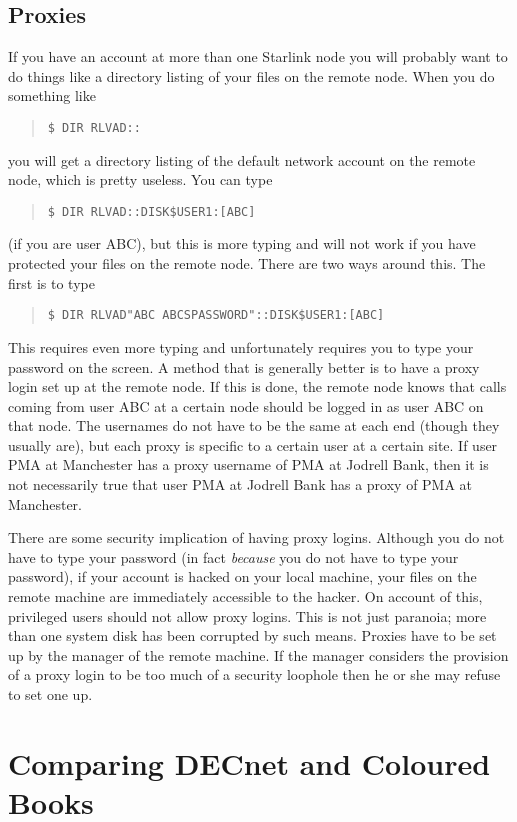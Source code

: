 \subsection{Proxies}
If you have an account at more than one Starlink node you will probably
want to do things like a directory listing of your files on the remote
node. When you do something like
\begin{quote}
{\tt \$ DIR RLVAD::}
\end{quote}
you will get a directory listing of the default network account on the
remote node, which is pretty useless. You can type
\begin{quote}
{\tt \$ DIR RLVAD::DISK\$USER1:[ABC]}
\end{quote}
(if you are user ABC), but this is more typing and will not work if you
have protected your files on the remote node. There are two ways around
this. The first is to type
\begin{quote}
{\tt \$ DIR RLVAD"ABC ABCSPASSWORD"::DISK\$USER1:[ABC]}
\end{quote}
This requires even more typing and unfortunately requires you to type your
password on the screen. A method that is generally better is to have a proxy
login set up at the remote node. If this is done, the remote node knows that
calls coming from user ABC at a certain node should be logged in as user ABC on
that node. The usernames do not have to be the same at each end (though they
usually are), but each proxy is specific to a certain user at a certain site.
If user PMA at Manchester has a proxy username of PMA at Jodrell Bank, then it
is not necessarily true that user PMA at Jodrell Bank has a proxy of PMA at
Manchester.

There are some security implication of having proxy logins. Although you do
not have to type your password (in fact {\it because} you do not have to
type your password), if your account is hacked on your local machine, your
files on the remote machine are immediately accessible to the hacker. On
account of this, privileged users should not allow proxy logins. This is
not just paranoia; more than one system disk has been corrupted by such
means. Proxies have to be set up by the manager of the remote machine. If
the manager considers the provision of a proxy login to be too much of a
security loophole then he or she may refuse to set one up.

\section{Comparing DECnet and Coloured Books}
\label{post-mail}

